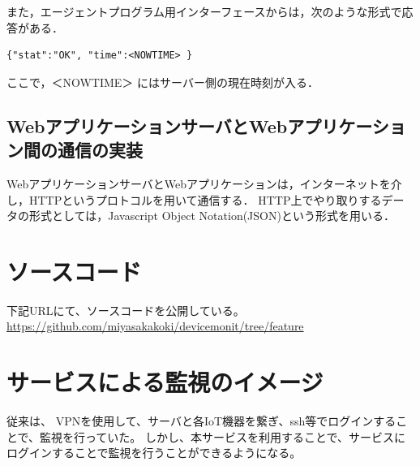 また，エージェントプログラム用インターフェースからは，次のような形式で応答がある．
\begin{lstlisting}[caption=エージェントプログラム用インターフェースからエージェントプログラムへの応答の形式,label=format2]
{"stat":"OK", "time":<NOWTIME> }
\end{lstlisting}
ここで，＜NOWTIME＞ にはサーバー側の現在時刻が入る．


\subsection{WebアプリケーションサーバとWebアプリケーション間の通信の実装}
WebアプリケーションサーバとWebアプリケーションは，インターネットを介し，HTTPというプロトコルを用いて通信する．
HTTP上でやり取りするデータの形式としては，Javascript Object Notation(JSON)という形式を用いる．

\section{ソースコード}
下記URLにて、ソースコードを公開している。
\url{https://github.com/miyasakakoki/devicemonit/tree/feature}

\section{サービスによる監視のイメージ}
従来は、
VPNを使用して、サーバと各IoT機器を繋ぎ、ssh等でログインすることで、監視を行っていた。
しかし、本サービスを利用することで、サービスにログインすることで監視を行うことができるようになる。



